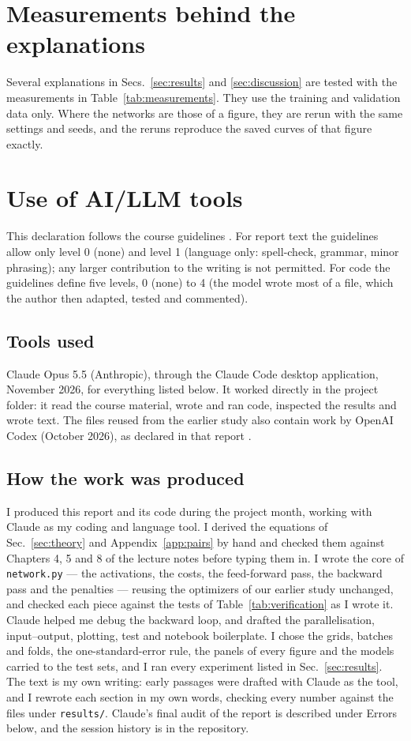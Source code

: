 \documentclass[aps,prb,reprint,superscriptaddress,nofootinbib,longbibliography,floatfix]{revtex4-2}
\begin{document}
\section{Measurements behind the explanations}\label{app:measurements}
Several explanations in Secs.~\ref{sec:results} and \ref{sec:discussion} are tested with the measurements in Table~\ref{tab:measurements}. They use the training and validation data only. Where the networks are those of a figure, they are rerun with the same settings and seeds, and the reruns reproduce the saved curves of that figure exactly.

\section{Use of AI/LLM tools}\label{app:llm}
This declaration follows the course guidelines \cite{LLMGuidelines2026}. For report text the guidelines allow only level 0 (none) and level 1 (language only: spell-check, grammar, minor phrasing); any larger contribution to the writing is not permitted. For code the guidelines define five levels, 0 (none) to 4 (the model wrote most of a file, which the author then adapted, tested and commented).

\subsection{Tools used}
Claude Opus 5.5 (Anthropic), through the Claude Code desktop application, November 2026, for everything listed below. It worked directly in the project folder: it read the course material, wrote and ran code, inspected the results and wrote text. The files reused from the earlier study also contain work by OpenAI Codex (October 2026), as declared in that report \cite{Ozdber2026}.

\subsection{How the work was produced}

I produced this report and its code during the project month, working with Claude as my coding and language tool. I derived the equations of Sec.~\ref{sec:theory} and Appendix~\ref{app:pairs} by hand and checked them against Chapters 4, 5 and 8 of the lecture notes before typing them in. I wrote the core of \texttt{network.py} --- the activations, the costs, the feed-forward pass, the backward pass and the penalties --- reusing the optimizers of our earlier study unchanged, and checked each piece against the tests of Table~\ref{tab:verification} as I wrote it. Claude helped me debug the backward loop, and drafted the parallelisation, input--output, plotting, test and notebook boilerplate. I chose the grids, batches and folds, the one-standard-error rule, the panels of every figure and the models carried to the test sets, and I ran every experiment listed in Sec.~\ref{sec:results}. The text is my own writing: early passages were drafted with Claude as the tool, and I rewrote each section in my own words, checking every number against the files under \texttt{results/}. Claude's final audit of the report is described under Errors below, and the session history is in the repository.
\end{document}
